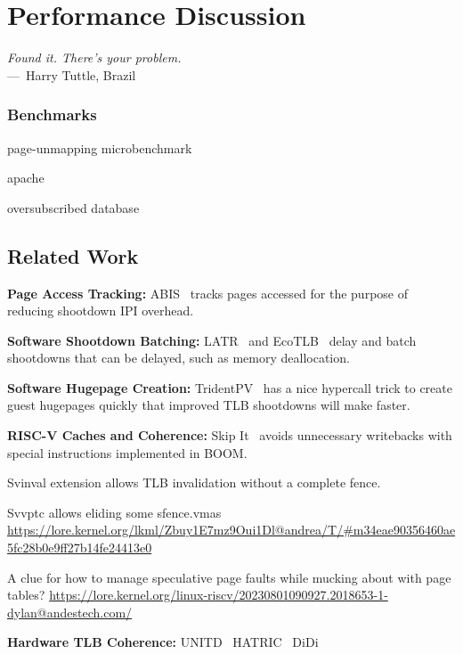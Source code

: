 
\chapter{Performance Discussion}
\label{ch:discussion}

\begin{epigraph}
	\emph{Found it. There's your problem.}\\
	---~Harry Tuttle, Brazil
\end{epigraph}

\subsection{Benchmarks}

page-unmapping microbenchmark

apache

oversubscribed database


\section{Related Work}
\textbf{Page Access Tracking:} ABIS~\cite{amit_optimizing_2017} tracks pages accessed for the purpose of reducing shootdown IPI overhead.

\textbf{Software Shootdown Batching:} LATR~\cite{kumar_latr_2018} and EcoTLB~\cite{maass_ecotlb_2020} delay and batch shootdowns that can be delayed, such as memory deallocation.

\textbf{Software Hugepage Creation:} TridentPV~\cite{ram_trident_2021} has a nice hypercall trick to create guest hugepages quickly that improved TLB shootdowns will make faster.

\textbf{RISC-V Caches and Coherence:} Skip It~\cite{anand_skip_2024} avoids unnecessary writebacks with special instructions implemented in BOOM.

Svinval extension allows TLB invalidation without a complete fence.

Svvptc allows eliding some sfence.vmas \url{https://lore.kernel.org/lkml/Zbuy1E7mz9Oui1Dl@andrea/T/#m34eae90356460ae5fc28b0e9ff27b14fe24413e0}

A clue for how to manage speculative page faults while mucking about with page tables? \url{https://lore.kernel.org/linux-riscv/20230801090927.2018653-1-dylan@andestech.com/}

\textbf{Hardware TLB Coherence:}
UNITD~\cite{romanescu_unified_2010}
HATRIC~\cite{yan_hardware_2017}
DiDi~\cite{villavieja_didi_2011}

